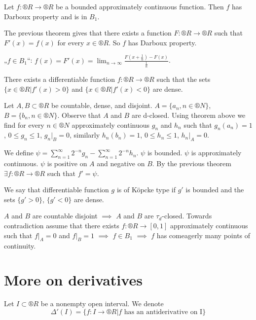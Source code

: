 \documentclass[12pt]{article}					%
\begin{document}

\begin{dusledek}
	Let $f: ®R \rightarrow ®R$ be a bounded approximately continuous function. Then $f$ has Darboux property and is in $B_1$.

	\begin{dukazin}
		The previous theorem gives that there exists a function $F: ®R \rightarrow ®R$ such that $F'(x) = f(x)$ for every $x \in ®R$. So $f$ has Darboux property.

		„$f \in B_1$“: $f(x) = F'(x) = \lim_{n \rightarrow ∞} \frac{F(x + \frac{1}{n}) - F(x)}{\frac{1}{n}}$.
	\end{dukazin}
\end{dusledek}

\begin{veta}
	There exists a differentiable function $f: ®R \rightarrow ®R$ such that the sets $\{x \in ®R | f'(x) > 0\}$ and $\{x \in ®R | f'(x) < 0\}$ are dense.

	\begin{dukazin}
		Let $A, B \subset ®R$ be countable, dense, and disjoint. $A = \{a_n, n \in ®N\}$, $B = \{b_n, n \in ®N\}$. Observe that $A$ and $B$ are d-closed. Using theorem above we find for every $n \in ®N$ approximately continuous $g_n$ and $h_n$ such that $g_n(a_n) = 1$, $0 ≤ g_n ≤ 1$, $g_n|_B = 0$, similarly $h_n(b_n) = 1$, $0 ≤ h_n ≤ 1$, $h_n|_A = 0$.

		We define $ψ = \sum_{n=1}^∞ 2^{-n} g_n - \sum_{n=1}^∞ 2^{-n} h_n$. $ψ$ is bounded. $ψ$ is approximately continuous. $ψ$ is positive on $A$ and negative on $B$. By the previous theorem $\exists f: ®R \rightarrow ®R$ such that $f' = ψ$.
	\end{dukazin}
\end{veta}

\begin{poznamka}
	We say that differentiable function $g$ is of Köpcke type if $g'$ is bounded and the sets $\{g' > 0\}$, $\{g' < 0\}$ are dense.
\end{poznamka}

\begin{poznamka}
	$A$ and $B$ are countable disjoint $\implies$ $A$ and $B$ are $τ_d$-closed. Towards contradiction assume that there exists $f: ®R \rightarrow [0, 1]$ approximately continuous such that $f|_A = 0$ and $f|_B = 1$ $\implies$ $f \in B_1$ $\implies$ $f$ has comeagerly many points of continuity.
\end{poznamka}

\section{More on derivatives}
\begin{definice}[Notation]
	Let $I \subset ®R$ be a nonempty open interval. We denote
	$$ Δ'(I) = \{f: I \rightarrow ®R | f \text{ has an antiderivative on I}\} $$
\end{definice}
\end{document}
